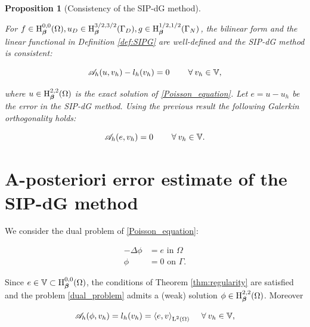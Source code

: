 \documentclass[a4paper,11pt]{article}
\newtheorem{props}[theorem]{Proposition}
\begin{document}
\begin{props}[Consistency of the SIP-dG method]\label{prop:consistency}

For $f \in \operatorname H^{0,0}_{\boldsymbol \beta}(\Omega), u_{D} \in \operatorname H^{3/2,3/2}_{\boldsymbol \beta}(\Gamma_{D}), g \in \operatorname H^{1/2,1/2}_{\boldsymbol \beta}(\Gamma_{N})$, the bilinear form and the linear functional in Definition \ref{def:SIPG} are well-defined and the SIP-dG method is consistent:

\begin{equation}
    \mathscr A_{h}(u,v_{h}) - l_{h}(v_{h}) = 0   \quad  \quad\:\forall\: v_{h} \in \mathbb V,
\label{eq:consistency}
\end{equation}

where $u \in \operatorname H^{2,2}_{\boldsymbol \beta}(\Omega)$ is the exact solution of \eqref{Poisson_equation}. Let $e = u - u_{h}$ be the error in the SIP-dG method. Using the previous result the following Galerkin orthogonality holds:

\begin{equation}
   \mathscr A_{h}(e,v_{h}) = 0 \quad \quad\:\forall\: v_{h} \in \mathbb V.
\label{Galerkin_orthogonality}
\end{equation}

\end{props}

\section{A-posteriori error estimate of the SIP-dG method}
\label{sec:a-posteriori}

We consider the dual problem of \eqref{Poisson_equation}:

\begin{equation} \label{dual_problem}
\begin{split}
    - \Delta \phi &= e  \text{ in } \Omega \\
    \phi &= 0  \text{ on } \Gamma.
\end{split}
\end{equation}

Since $e \in \mathbb V \subset \operatorname H^{0,0}_{\boldsymbol \beta}(\Omega)$, the conditions of Theorem \ref{thm:regularity} are satisfied and the problem \eqref{dual_problem} admits a (weak) solution $\phi \in \operatorname H^{2,2}_{\boldsymbol \beta}(\Omega)$. Moreover

\begin{equation}\label{dual_problem_weak}
  \mathscr A_{h}(\phi,v_{h}) = l_{h}(v_{h}) = \left\langle{e,v}\right\rangle_{\operatorname L^{2}(\Omega)} \quad\:\forall\: v_{h} \in \mathbb V,
\end{equation}
\end{document}
